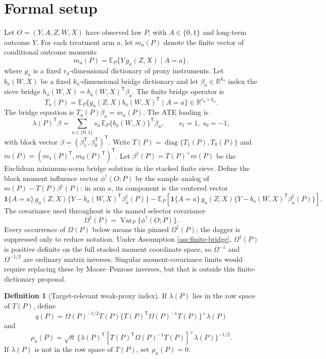 \documentclass[11pt]{article}
\newcommand{\E}{\mathbb{E}}
\newcommand{\one}{\mathbf{1}}
\newcommand{\transpose}{\mathsf{T}}
\newcommand{\R}{\mathbb{R}}
\theoremstyle{definition}
\newtheorem{definition}{Definition}
\theoremstyle{plain}
\theoremstyle{remark}
\begin{document}
\section{Formal setup}
Let $O=(Y,A,Z,W,X)$ have observed law $P$, with $A\in\{0,1\}$ and long-term
outcome $Y$.  For each treatment arm $a$, let $m_a(P)$ denote the finite vector
of conditional outcome moments
\[
m_a(P)=\E_P\{Y\,g_a(Z,X)\mid A=a\},
\]
where $g_a$ is a fixed $r_a$-dimensional dictionary of proxy instruments.  Let
$b_a(W,X)$ be a fixed $k_a$-dimensional bridge dictionary and let
$\beta_a\in\R^{k_a}$ index the sieve bridge $h_a(W,X)=b_a(W,X)^\transpose
\beta_a$.  The finite bridge operator is
\[
T_a(P)=\E_P\{g_a(Z,X)b_a(W,X)^\transpose\mid A=a\}\in\R^{r_a\times k_a}.
\]
The bridge equation is $T_a(P)\beta_a=m_a(P)$.  The ATE loading is
\[
\lambda(P)^\transpose\beta
=\sum_{a\in\{0,1\}}s_a\,\E_P\{b_a(W,X)\}^\transpose\beta_a,\qquad
s_1=1,\ s_0=-1,
\]
with block vector $\beta=(\beta_1^\transpose,\beta_0^\transpose)^\transpose$.
Write $T(P)=\operatorname{diag}\{T_1(P),T_0(P)\}$ and
$m(P)=(m_1(P)^\transpose,m_0(P)^\transpose)^\transpose$.  Let
$\beta^\dagger(P)=T(P)^+m(P)$ be the Euclidean minimum-norm bridge solution
in the stacked finite sieve.  Define the block moment influence vector
$\phi^\dagger(O;P)$ by the sample analog of $m(P)-T(P)\beta^\dagger(P)$:
in arm $a$, its component is the centered vector
\[
\one\{A=a\}\,g_a(Z,X)\{Y-b_a(W,X)^\transpose\beta_a^\dagger(P)\}
 - \E_P[\one\{A=a\}\,g_a(Z,X)\{Y-b_a(W,X)^\transpose\beta_a^\dagger(P)\}].
\]
The covariance used throughout is the named selector covariance
\[
\Omega^\dagger(P)=\operatorname{Var}_P\{\phi^\dagger(O;P)\}.
\]
Every occurrence of $\Omega(P)$ below means this pinned
$\Omega^\dagger(P)$; the dagger is suppressed only to reduce notation.  Under
Assumption \ref{ass:finite-bridge}, $\Omega^\dagger(P)$ is positive definite on
the full stacked moment coordinate space, so $\Omega^{-1}$ and
$\Omega^{-1/2}$ are ordinary matrix inverses.  Singular moment-covariance
limits would require replacing these by Moore--Penrose inverses, but that is
outside this finite-dictionary proposal.

\begin{definition}[Target-relevant weak-proxy index]
If $\lambda(P)$ lies in the row space of $T(P)$, define
\[
q(P)=\Omega(P)^{-1/2}T(P)
\{T(P)^\transpose\Omega(P)^{-1}T(P)\}^+\lambda(P)
\]
and
\[
\rho_n(P)=\sqrt{n}\,
\Big\{\lambda(P)^\transpose
[T(P)^\transpose\Omega(P)^{-1}T(P)]^+\lambda(P)\Big\}^{-1/2}.
\]
If $\lambda(P)$ is not in the row space of $T(P)$, set $\rho_n(P)=0$.
\end{definition}
\end{document}
